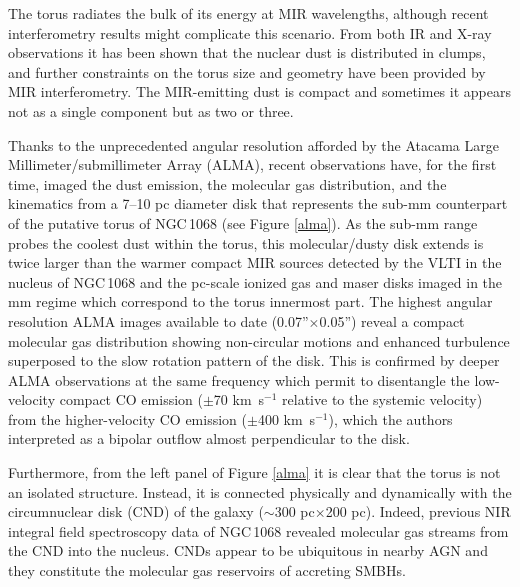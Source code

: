\documentclass{natureprintstyle}
\def\arcsec{''}
\begin{document}
{The torus radiates the bulk of its energy at MIR wavelengths, although recent interferometry results might complicate this scenario\cite{Honig12,Honig13,Lopez16}. 
From both IR and X-ray observations it has been shown that the nuclear dust is distributed in clumps\cite{Ramos09,Markowitz:2014oq}, and further constraints on the torus 
size and geometry have been provided by MIR interferometry\cite{Burtscher13,Lopez16}. The MIR-emitting dust is compact and sometimes it appears not 
as a single component but as two or three\cite{Tristram14}.} 

Thanks to the unprecedented angular resolution afforded by the Atacama Large Millimeter/submillimeter Array (ALMA), {recent observations have, for the first time, imaged the dust emission, the molecular gas distribution, and the kinematics from a 7--10 pc diameter disk that represents the sub-mm counterpart of the putative torus of NGC\,1068\cite{Imanishi16,Garcia16,Gallimore16} (see Figure \ref{alma}). As the sub-mm range probes the coolest dust within the torus, this molecular/dusty disk extends is twice larger than the warmer compact MIR sources detected by the VLTI in the nucleus of NGC\,1068\cite{Lopez14} and the pc-scale ionized gas and maser disks imaged in the mm regime\cite{Gallimore96,Gallimore97} which correspond to the torus innermost part. The highest angular resolution ALMA images available to date (0.07\arcsec$\times$0.05\arcsec) reveal a compact molecular gas distribution showing non-circular motions and enhanced turbulence superposed to the slow rotation pattern of the disk\cite{Garcia16}. This is confirmed by deeper ALMA observations at the same frequency\cite{Gallimore16} which permit to disentangle the low-velocity compact CO emission ($\pm$70 km~s$^{-1}$ relative to the systemic velocity) from the higher-velocity CO emission ($\pm$400 km~s$^{-1}$), which the authors interpreted as a bipolar outflow almost perpendicular to the disk.} 

Furthermore, from the left panel of Figure \ref{alma} it is clear that the torus is not an isolated structure. Instead, it is connected physically and dynamically with the circumnuclear disk (CND) of the galaxy\cite{Garcia16} ($\sim$300 pc$\times$200 pc). Indeed, previous NIR integral field spectroscopy data of NGC\,1068 revealed molecular gas streams from the CND into the nucleus\cite{Muller09}. CNDs appear to be ubiquitous in nearby AGN and they constitute the molecular gas reservoirs of accreting SMBHs\cite{Hicks13}. 
\end{document}
